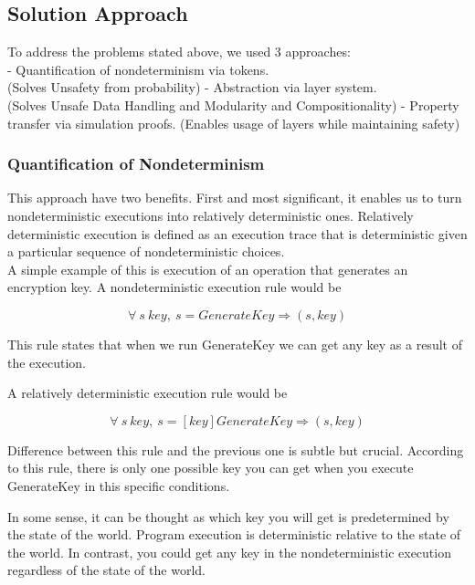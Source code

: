 \subsection*{Solution Approach}
To address the problems stated above, we used 3 approaches:\\
- Quantification of nondeterminism via tokens.\\ (Solves Unsafety from probability)
- Abstraction via layer system.\\ (Solves Unsafe Data Handling and Modularity and Compositionality)
- Property transfer via simulation proofs. (Enables usage of layers while maintaining safety)


\subsubsection*{Quantification of Nondeterminism}


This approach have two benefits. First and most significant, it enables us to
turn nondeterministic executions into relatively deterministic ones. 
Relatively deterministic execution is defined as an execution trace that is 
deterministic given a particular sequence of nondeterministic choices.\\

A simple example of this is execution of an operation that generates an encryption key. 
A nondeterministic execution rule would be

$$\forall\ s\ key,\ s  =GenerateKey\Rightarrow (s, key)$$ 

This rule states that when we run GenerateKey we can get any key as a result of the execution.

A relatively deterministic execution rule would be

$$\forall\ s\ key,\ s  =[key]GenerateKey\Rightarrow (s, key)$$ 

Difference between this rule and the previous one is subtle but crucial. 
According to this rule, there is only one possible key you can get when you execute GenerateKey in this specific conditions.

In some sense, it can be thought as which key you will get is predetermined by the state of the world. Program execution is deterministic relative to the state of the world.
In contrast, you could get any key in the nondeterministic execution regardless of the state of the world.

